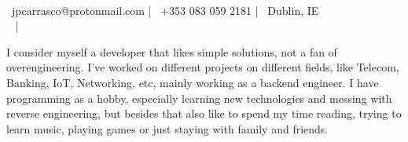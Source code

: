 \documentclass[]{awesome-cv}
\begin{document}
    
\begin{center}
	  \\
	\vspace{2mm}
	{\faEnvelope\ jpcarrasco@protonmail.com} | {\faMobile\ +353 083 059 2181} | {\faMapMarker\ Dublin, IE} \\ 
	{\faLinkedinSquare\ \color{darkblue}{https://www.linkedin.com/in/joao-carrasco/}} | {\faGithub\ \color{darkblue}{https://github.com/jpcrs/}} 
\end{center}

\begin{txtx}
I consider myself a developer that likes simple solutions, not a fan of overengineering. I've worked on different projects on different fields, like Telecom, Banking, IoT, Networking, etc, mainly working as a backend engineer. I have programming as a hobby, especially learning new technologies and messing with reverse engineering, but besides that also like to spend my time reading, trying to learn music, playing games or just staying with family and friends.
\end{txtx}
\end{document}
